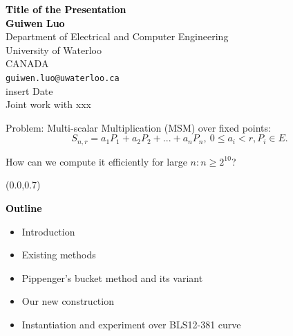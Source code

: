\documentclass{beamer}                  %
\newcommand{\UW}[1]{\textbf{\textcolor{black}{#1}}}
\newcommand{\UWtitle}[1]{
	\begin{textblock}{12.8}(0.0,0.7)
		\begin{center} 
			\textbf{\UW{\Large{#1}}}
		\end{center}
	\end{textblock}
}
\newcommand{\fillframe}{\vspace*{10cm}}
\begin{document}
	

\begin{frame}
\vspace*{2cm}
\begin{center}
{\Large \UW{Title of the Presentation}}\\
\vspace*{.3cm}
\UW{Guiwen Luo}\\

\vspace*{0.3cm}
        \small{Department of Electrical and Computer Engineering\\
          University of Waterloo\\
                CANADA\\
                \texttt{guiwen.luo@uwaterloo.ca}}
                \\
        \vspace*{0.3cm}
        \normalsize{insert Date}\\
\vspace*{0.3cm}
\normalsize{Joint work with xxx}\\
\end{center}

\fillframe
\end{frame}



   
\begin{frame}
    
    
    \begin{block}{Problem:}
    	Multi-scalar Multiplication (MSM) over fixed points: 
    	\begin{equation}\label{eq_multi_scalar_multiplication}
				S_{n,r} = a_1P_1+a_2P_2+...+a_nP_n,\ 0\le a_i< r, P_i\in E.				
				\end{equation}
    \end{block}
How can we compute it efficiently for large $n: n\ge 2^{10}$?

\end{frame}

\begin{frame}
	\UWtitle{Outline}
	\begin{itemize}
	\item Introduction
	\item Existing methods
	\item Pippenger's bucket method and its variant
	\item Our new construction
	\item Instantiation and experiment over BLS12-381 curve
	\end{itemize}
\end{frame}
\end{document}

